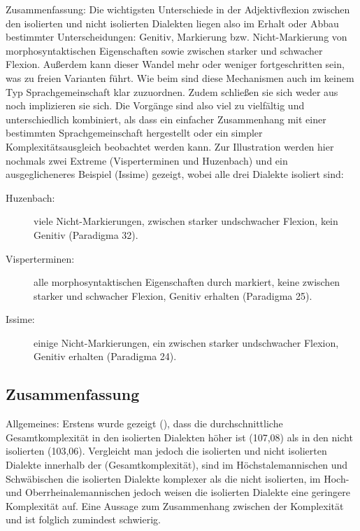 Zusammenfassung: Die wichtigsten Unterschiede in der Adjektivflexion zwischen den isolierten und nicht isolierten Dialekten liegen also im Erhalt oder Abbau bestimmter Unterscheidungen: Genitiv, Markierung bzw. Nicht-Mar\-kie\-rung von morphosyntaktischen Eigenschaften sowie  zwischen starker und schwacher Flexion. Außerdem kann dieser Wandel mehr oder weniger fortgeschritten sein, was zu freien Varianten führt. Wie beim  sind diese Mechanismen auch im  keinem Typ Sprachgemeinschaft klar zuzuordnen. Zudem schließen sie sich weder aus noch implizieren sie sich. Die Vorgänge sind also viel zu vielfältig und unterschiedlich kombiniert, als dass ein einfacher Zusammenhang mit einer bestimmten Sprachgemeinschaft hergestellt oder ein simpler Komplexitätsausgleich beobachtet werden kann. Zur Illustration werden hier nochmals zwei Extreme (Visperterminen und Huzenbach) und ein ausgeglicheneres Beispiel (Issime) gezeigt, wobei alle drei Dialekte isoliert sind:

\begin{description}
\item[Huzenbach:] viele Nicht-Mar\-kie\-rung\-en,  zwischen starker und\linebreak schwacher Flexion, kein Genitiv (Paradigma 32).
\item[Visperterminen:] alle morphosyntaktischen Eigenschaften durch  markiert, keine  zwischen starker und schwacher Flexion, Genitiv erhalten (Paradigma 25).
\item[Issime:] einige Nicht-Mar\-kie\-rung\-en, ein  zwischen starker und\linebreak schwacher Flexion, Genitiv erhalten (Paradigma 24).
\end{description}

\subsection{Zusammenfassung}\label{6.5.4}

{Allgemeines:} Erstens wurde gezeigt (), dass die durchschnittliche Gesamtkomplexität in den isolierten Dialekten höher ist (107,08) als in den nicht isolierten (103,06). Vergleicht man jedoch die isolierten und nicht isolierten Dialekte innerhalb der  (Gesamtkomplexität), sind im Höchstalemannischen und Schwäbischen die isolierten Dialekte komplexer als die nicht isolierten, im Hoch- und Oberrheinalemannischen jedoch weisen die isolierten Dialekte eine geringere Komplexität auf. Eine Aussage zum Zusammenhang zwischen der Komplexität und  ist folglich zumindest schwierig.

